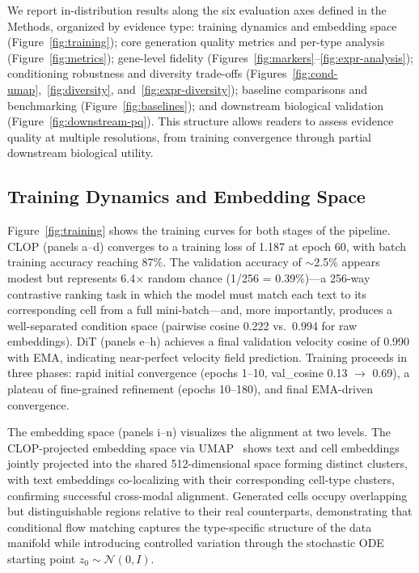 \documentclass[genes,article,submit,pdftex,oneauthor]{Definitions/mdpi}
\begin{document}
We report in-distribution results along the six evaluation axes defined in the Methods, organized by evidence type:
training dynamics and embedding space (Figure~\ref{fig:training});
core generation quality metrics and per-type analysis (Figure~\ref{fig:metrics});
gene-level fidelity (Figures~\ref{fig:markers}--\ref{fig:expr-analysis});
conditioning robustness and diversity trade-offs (Figures~\ref{fig:cond-umap},~\ref{fig:diversity}, and~\ref{fig:expr-diversity});
baseline comparisons and benchmarking (Figure~\ref{fig:baselines});
and downstream biological validation (Figure~\ref{fig:downstream-pq}).
This structure allows readers to assess evidence quality at multiple resolutions, from training convergence through partial downstream biological utility.

\subsection{Training Dynamics and Embedding Space}

Figure~\ref{fig:training} shows the training curves for both stages of the pipeline. CLOP (panels a--d) converges to a training loss of 1.187 at epoch 60, with batch training accuracy reaching 87\%. The validation accuracy of $\sim$2.5\% appears modest but represents 6.4$\times$ random chance (1/256 = 0.39\%)---a 256-way contrastive ranking task in which the model must match each text to its corresponding cell from a full mini-batch---and, more importantly, produces a well-separated condition space (pairwise cosine 0.222 vs.\ 0.994 for raw embeddings). DiT (panels e--h) achieves a final validation velocity cosine of 0.990 with EMA, indicating near-perfect velocity field prediction. Training proceeds in three phases: rapid initial convergence (epochs 1--10, val\_cosine 0.13 $\to$ 0.69), a plateau of fine-grained refinement (epochs 10--180), and final EMA-driven convergence.

The embedding space (panels i--n) visualizes the alignment at two levels. The CLOP-projected embedding space via UMAP~\cite{ref-umap} shows text and cell embeddings jointly projected into the shared 512-dimensional space forming distinct clusters, with text embeddings co-localizing with their corresponding cell-type clusters, confirming successful cross-modal alignment. Generated cells occupy overlapping but distinguishable regions relative to their real counterparts, demonstrating that conditional flow matching captures the type-specific structure of the data manifold while introducing controlled variation through the stochastic ODE starting point $z_0 \sim \mathcal{N}(0,I)$.
\end{document}
